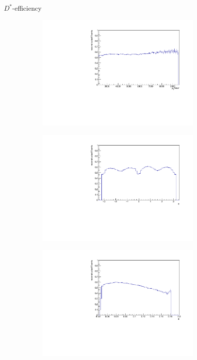 \documentclass[11pt]{beamer}
\begin{document}
\begin{frame}{$D^*$-efficiency}
\begin{figure}
\begin{subfigure}{0.45\textwidth}
\includegraphics[width=0.9\textwidth]{up_pdf/tot/h_pt_reco_Dst.pdf}
\end{subfigure}
\begin{subfigure}{0.45\textwidth}
\includegraphics[width=0.9\textwidth]{up_pdf/tot/h_phi_reco_Dst.pdf}
\end{subfigure}
\begin{subfigure}{0.45\textwidth}
\includegraphics[width=0.9\textwidth]{up_pdf/tot/h_theta_reco_Dst.pdf}

\end{subfigure}
\end{figure}
\end{frame}
\end{document}
